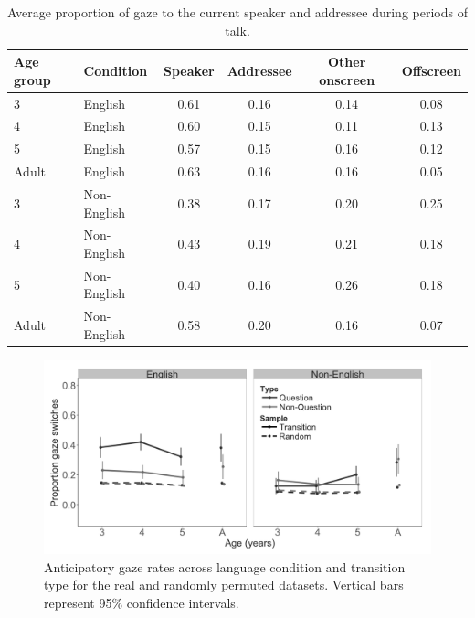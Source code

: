 \documentclass[authoryear, 12pt]{elsarticle}
\begin{document}
\linespread{1}
\begin{table}[t]
\begin{center}
  \begin{tabular}{llcccc}
    \hline
    Age group & Condition & Speaker & Addressee & Other onscreen & Offscreen\\ 
    \hline
    3 & English & 0.61 & 0.16 & 0.14 & 0.08 \\ 
    4 & English & 0.60 & 0.15 & 0.11 & 0.13 \\ 
    5 & English & 0.57 & 0.15 & 0.16 & 0.12 \\ 
    Adult & English & 0.63 & 0.16 & 0.16 & 0.05 \\ 
    3 & Non-English & 0.38 & 0.17 & 0.20 & 0.25 \\ 
    4 & Non-English & 0.43 & 0.19 & 0.21 & 0.18 \\ 
    5 & Non-English & 0.40 & 0.16 & 0.26 & 0.18 \\ 
    Adult & Non-English & 0.58 & 0.20 & 0.16 & 0.07 \\ 
    \hline
  \end{tabular}
\end{center}
  \caption{Average proportion of gaze to the current speaker and addressee during periods of talk.}
\label{tab:e1_look}
\end{table}

\begin{figure}[h]
\begin{center}
\includegraphics[width=1\textwidth]{figures/E1-samples-by-lang-groups-trans-types.png}
\end{center}
\caption{Anticipatory gaze rates across language condition and transition type for the real and randomly permuted datasets. Vertical bars represent 95\% confidence intervals.} 
\label{fig:E1-randvsreal}
\end{figure}
\end{document}
